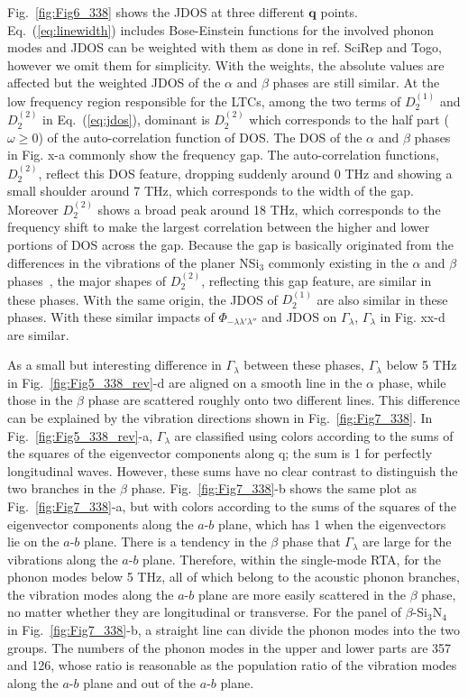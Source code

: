 \documentclass[twocolumn,amsmath,amssymb,a4paper,prb,superscriptaddress,floatfix]{revtex4-1}
\begin{document}
Fig.~\ref{fig:Fig6_338} shows the JDOS at three different $\mathbf{q}$ points.
Eq.~(\ref{eq:linewidth}) includes Bose-Einstein functions for the involved
phonon modes and JDOS can be weighted with them as done in ref. SciRep and
Togo, however we omit them for simplicity.  With the weights, the absolute
values are affected but the weighted JDOS of the $\alpha$ and $\beta$ phases
are still similar. At the low frequency region responsible for the LTCs, among
the two terms of $D_2^{(1)}$ and $D_2^{(2)}$ in Eq.~(\ref{eq:jdos}), dominant
is $D_2^{(2)}$ which corresponds to the half part ($\omega \geq  0$) of the
auto-correlation function of DOS. The DOS of the $\alpha$ and $\beta$ phases in
Fig. x-a commonly show the frequency gap.  The auto-correlation functions,
$D_2^{(2)}$, reflect this DOS feature, dropping suddenly around 0 THz and
showing a small shoulder around 7 THz, which corresponds to the width of the
gap. Moreover $D_2^{(2)}$ shows a broad peak around 18 THz, which corresponds
to the frequency shift to make the largest correlation between the higher and
lower portions of DOS across the gap. Because the gap is basically originated
from the differences in the vibrations of the planer NSi$_3$ commonly existing
in the $\alpha$ and $\beta$ phases~\cite{kuwabara}, the major shapes of
$D_2^{(2)}$, reflecting this gap feature, are similar in these phases. With the
same origin, the JDOS of $D_2^{(1)}$ are also similar in these phases. With
these similar impacts of $\Phi_{-\lambda\lambda'\lambda''}$ and JDOS on
$\Gamma_\lambda$, $\Gamma_\lambda$ in Fig. xx-d are similar.  

As a small but interesting difference in $\Gamma_\lambda$ between these phases,
$\Gamma_\lambda$ below 5 THz in Fig.~\ref{fig:Fig5_338_rev}-d are aligned on a
smooth line in the $\alpha$ phase, while those in the $\beta$ phase are
scattered roughly onto two different lines. This difference can be explained by
the vibration directions shown in Fig.~\ref{fig:Fig7_338}. In
Fig.~\ref{fig:Fig5_338_rev}-a, $\Gamma_\lambda$ are classified using colors
according to the sums of the squares of the eigenvector components along q; the
sum is 1 for perfectly longitudinal waves. However, these sums have no clear
contrast to distinguish the two branches in the $\beta$ phase.
Fig.~\ref{fig:Fig7_338}-b shows the same plot as Fig.~\ref{fig:Fig7_338}-a, but
with colors according to the sums of the squares of the eigenvector components
along the $a$-$b$ plane, which has 1 when the eigenvectors lie on the $a$-$b$
plane. There is a tendency in the $\beta$ phase that  $\Gamma_\lambda$ are
large for the vibrations along the $a$-$b$ plane. Therefore, within the
single-mode RTA, for the phonon modes below 5 THz, all of which belong to the
acoustic phonon branches, the vibration modes along the $a$-$b$ plane are more
easily scattered in the $\beta$ phase, no matter whether they are longitudinal
or transverse. For the panel of $\beta$-Si$_3$N$_4$ in
Fig.~\ref{fig:Fig7_338}-b, a straight line can divide the phonon modes into the
two groups. The numbers of the phonon modes in the upper and lower parts are
357 and 126, whose ratio is reasonable as the population ratio of the vibration
modes along the $a$-$b$ plane and out of the $a$-$b$ plane.
\end{document}
